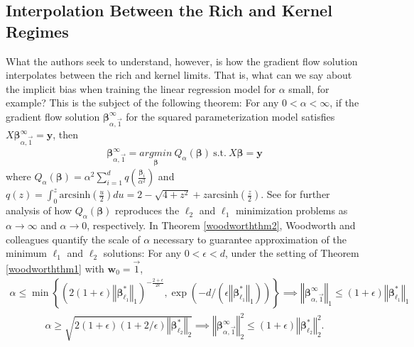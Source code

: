 \documentclass{article}
\newenvironment{manualtheorem}[1]{%
  \renewcommand\themanualtheoreminner{#1}%
  \manualtheoreminner
}{\endmanualtheoreminner}
\begin{document}
\subsection{Interpolation Between the Rich and Kernel Regimes}
What the authors seek to understand, however, is how the gradient flow solution interpolates between the rich and kernel limits. That is, what can we say about the implicit bias when training the linear regression model for $\alpha$ small, for example? This is the subject of the following theorem:
\begin{manualtheorem}{1}\label{woodworththm1}
For any $0 < \alpha < \infty$, if the gradient flow solution $\boldsymbol{\beta}_{\alpha, \vec{1}}^{\infty}$ for the squared parameterization model satisfies $X\boldsymbol{\beta}_{\alpha, \vec{1}}^{\infty} = \boldsymbol{y}$, then 
\begin{align*}
    \boldsymbol{\beta}_{\alpha, \vec{1}}^{\infty} = \underset{\boldsymbol{\beta}}{argmin} \ Q_{\alpha}(\boldsymbol{\beta}) \ \text{s.t.} \ X\boldsymbol{\beta} = \boldsymbol{y}
\end{align*}
where $Q_{\alpha}(\boldsymbol{\beta}) = \alpha^2 \sum_{i=1}^d q\left(\frac{\boldsymbol{\beta}_i}{\alpha^2}\right)$ and $q(z) = \int_0^z \text{arcsinh}\left(\frac{u}{2} \right) du = 2 - \sqrt{4+z^2} + z \text{arcsinh}\left(\frac{z}{2} \right).$
\end{manualtheorem}
See \cite{woodworth2020kernel} for further analysis of how $Q_{\alpha}(\boldsymbol{\beta})$ reproduces the $\ell_2$ and $\ell_1$ minimization problems as $\alpha \rightarrow \infty$ and $\alpha \rightarrow 0$, respectively. In Theorem \ref{woodworththm2}, Woodworth and colleagues quantify the scale of $\alpha$ necessary to guarantee approximation of the minimum $\ell_1$ and $\ell_2$ solutions:
\begin{manualtheorem}{2}\label{woodworththm2}
For any $0 < \epsilon < d$, under the setting of Theorem \ref{woodworththm1} with $\boldsymbol{w}_0 = \vec{1}$, 
\begin{align*}
    \alpha \leq \min \left\{ (2(1 + \epsilon)\left\Vert \boldsymbol{\beta}_{\ell_1}^* \right\Vert_1)^{-\frac{2+ \epsilon}{2\epsilon}}, \exp \left(-d/(\epsilon \left\Vert \boldsymbol{\beta}_{\ell_1}^* \right\Vert_1) \right) \right\} \implies \left\Vert \boldsymbol{\beta}_{\alpha, \vec{1}}^{\infty}\right\Vert_1 \leq (1+\epsilon)\left\Vert \boldsymbol{\beta}_{\ell_1}^* \right\Vert_1
\end{align*}
\begin{align*}
    \alpha \geq \sqrt{2(1+ \epsilon)(1 + 2/\epsilon)\left\Vert \boldsymbol{\beta}_{\ell_2}^* \right\Vert_2} \implies \left\Vert \boldsymbol{\beta}_{\alpha, \vec{1}}^{\infty}\right\Vert_2^2 \leq (1+\epsilon)\left\Vert \boldsymbol{\beta}_{\ell_2}^* \right\Vert_2^2.
\end{align*}
\end{manualtheorem}
\end{document}
